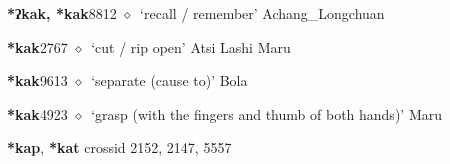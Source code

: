 \begin{list}{}{\leftmargin=1.5em \itemindent=-1.5em}
  \item {\footnotesize \textbf{*ʔkak, *kak}}{\tiny 8812}
\hspace{1ex}
         $\diamond$~`recall / remember'
         Achang\_Longchuan 
  \item {\footnotesize \textbf{*kak}}{\tiny 2767}
\hspace{1ex}
         $\diamond$~`cut / rip open'
         Atsi 
\hspace{1ex}
         Lashi 
\hspace{1ex}
         Maru 
  \item {\footnotesize \textbf{*kak}}{\tiny 9613}
\hspace{1ex}
         $\diamond$~`separate (cause to)'
         Bola 
  \item {\footnotesize \textbf{*kak}}{\tiny 4923}
\hspace{1ex}
         $\diamond$~`grasp (with the fingers and thumb of both hands)'
         Maru 
  \end{list}
\item
\textbf{*kap}, \textbf{*kat}
  {\tiny crossid 2152, 2147, 5557}
